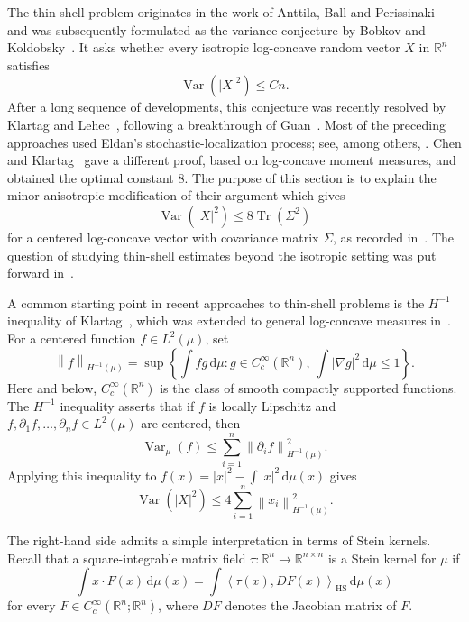 \documentclass[12pt]{article}
\theoremstyle{definition}
\theoremstyle{remark}
\newcommand{\R}{\mathbb R}
\newcommand{\Var}{\operatorname{Var}}
\newcommand{\Tr}{\operatorname{Tr}}
\newcommand{\HS}{\mathrm{HS}}
\newcommand{\dd}{\,\mathrm d}
\newcommand{\ip}[2]{\left\langle #1,#2\right\rangle}
\newcommand{\norm}[1]{\left\lVert #1\right\rVert}
\begin{document}
The thin-shell problem originates in the work of Anttila, Ball and
Perissinaki~\cite{AnttilaBallPerissinaki} and was subsequently
formulated as the variance conjecture by Bobkov and
Koldobsky~\cite{BobkovKoldobsky}. It asks whether every isotropic
log-concave random vector $X$ in $\R^n$ satisfies
\[
  \Var(|X|^2)\leq Cn.
\]
After a long sequence of developments, this conjecture was recently
resolved by Klartag and Lehec~\cite{KlartagLehec}, following a
breakthrough of Guan~\cite{Guan}. Most of the preceding approaches
used Eldan's stochastic-localization process; see, among others,
\cite{Eldan,LeeVempala,KlartagLehecPolylog,KlartagKLS,Guan,KlartagLehec}.
Chen and Klartag~\cite{ChenKlartag} gave a different proof, based on
log-concave moment measures, and obtained the optimal constant $8$.
The purpose of this section is to explain the minor anisotropic
modification of their argument which gives
\begin{equation}\label{eq_541}
  \Var(|X|^2)\leq8\Tr(\Sigma^2)
\end{equation}
for a centered log-concave vector with covariance matrix $\Sigma$, as
recorded in~\cite{Letwin}. The question of studying thin-shell
estimates beyond the isotropic setting was put forward
in~\cite{AlonsoBastero}.

A common starting point in recent approaches to thin-shell problems is
the $H^{-1}$ inequality of Klartag~\cite{KlartagHminus}, which was extended to general log-concave measures in~\cite{BartheKlartag}. For a centered function
$f\in L^2(\mu)$, set
\begin{equation}\label{eq_554}
  \norm{f}_{H^{-1}(\mu)}
  =
  \sup\left\{
    \int fg\dd\mu:
    g\in C_c^\infty(\R^n),\
    \int|\nabla g|^2\dd\mu\leq1
  \right\}.
\end{equation}
Here and below, $ C_c^\infty(\R^n)$ is the class of smooth compactly supported functions. The $H^{-1}$ inequality asserts that if $f$ is locally Lipschitz and 
$f,\partial_1f,\ldots,\partial_nf\in L^2(\mu)$ are centered,
then
\begin{equation}\label{eq_570}
  \Var_\mu(f)
  \leq
  \sum_{i=1}^n\norm{\partial_i f}_{H^{-1}(\mu)}^2.
\end{equation}
Applying this inequality to
$f(x)=|x|^2-\int|x|^2\dd\mu(x)$ gives
\begin{equation}\label{eq_577}
  \Var(|X|^2)
  \leq
  4\sum_{i=1}^n\norm{x_i}_{H^{-1}(\mu)}^2.
\end{equation}

The right-hand side admits a simple interpretation in terms of Stein
kernels. Recall that a square-integrable matrix field
$\tau:\R^n\to\R^{n\times n}$ is a Stein kernel for $\mu$ if
\begin{equation}\label{eq_586}
  \int x\cdot F(x)\dd\mu(x)
  =
  \int\ip{\tau(x)}{DF(x)}_{\HS}\dd\mu(x)
\end{equation}
for every $F\in C_c^\infty(\R^n;\R^n)$, where
$DF$ denotes the Jacobian matrix of $F$.
\end{document}
